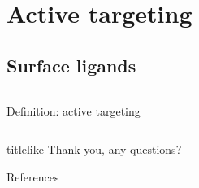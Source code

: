 \documentclass[aspectratio=169,compress]{beamer}
\renewcommand*{\bibfont}{\tiny}
\newcommand*{\autotitle}{\subsecname\hfill\textbf{\small\secname}}
\begin{document}
\section{Active targeting}

\subsection{Surface ligands}

\begin{frame}{\autotitle}
  \begin{columns}
      \begin{block}{Definition: active targeting} 
      \end{block}

  \end{columns}
\end{frame}

\begin{frame}
  \begin{beamercolorbox}[rounded=true,shadow=true,sep=8pt]{titlelike}\centering\Large
    Thank you, any questions?
  \end{beamercolorbox}
  \vfill
  \begin{block}{References}\bibfont
  \end{block}
\end{frame}
\end{document}
